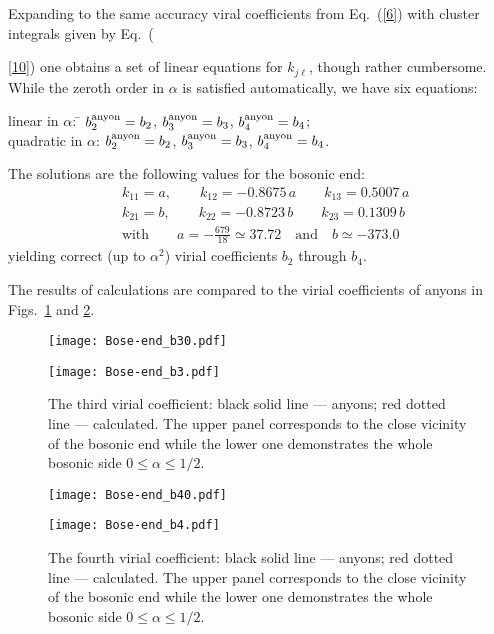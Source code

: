 \documentclass[12pt,a4paper]{article}
\begin{document}
Expanding to the same accuracy viral coefficients from Eq.~(\ref{6}) with cluster integrals given by Eq.~({\ref{10}) one obtains a set of linear equations for $k_{j\ell}$, though rather cumbersome. While the zeroth order in $\alpha$ is satisfied automatically, we have six equations:

\begin{tabbing}
linear in $\alpha$: \quad\qquad\= $b_2^{\rm anyon} = b_2$, \qquad 
$b_3^{\rm anyon} = b_3$, \qquad
$b_4^{\rm anyon} = b_4$;\\[12pt]
quadratic in $\alpha$: \>$b_2^{\rm anyon} = b_2$, \qquad 
$b_3^{\rm anyon} = b_3$, \qquad
$b_4^{\rm anyon} = b_4$.
\end{tabbing}

\noindent
The solutions are the following values for the bosonic end:
%
\begin{align}
&k_{11} = a, \qquad
k_{12} = -0.8675\, a\qquad
k_{13} = 0.5007\, a\nonumber\\[6pt]
%
&k_{21} = b, \qquad
k_{22} = -0.8723\, b\qquad
k_{23} = 0.1309\, b\\[6pt]
&\textrm{with}\qquad
a = -\frac{679}{18}\simeq37.72\quad\textrm{and}\quad
b \simeq -373.0\nonumber
\end{align}
yielding correct (up to $\alpha^2$) virial coefficients $b_2$ through $b_4$.

The results of calculations are compared to the virial coefficients of anyons in Figs.~\ref{fig:b3Bose} and \ref{fig:b4Bose}.

\begin{figure}[h]
\centerline{\texttt{[image: Bose-end\_b30.pdf]}}
\centerline{\texttt{[image: Bose-end\_b3.pdf]}}
\caption{The third virial coefficient:
black solid line --- anyons;
red dotted line --- calculated.
The upper panel corresponds to the close vicinity of the bosonic end while the lower one demonstrates the whole bosonic side $0\leq\alpha\leq1/2$.
}\label{fig:b3Bose}
\end{figure}

\begin{figure}[h]
\centerline{\texttt{[image: Bose-end\_b40.pdf]}}
\centerline{\texttt{[image: Bose-end\_b4.pdf]}}
\caption{The fourth virial coefficient:
black solid line --- anyons;
red dotted line --- calculated.
The upper panel corresponds to the close vicinity of the bosonic end while the lower one demonstrates the whole bosonic side $0\leq\alpha\leq1/2$.
}\label{fig:b4Bose}
\end{figure}
\clearpage

}
\end{document}
